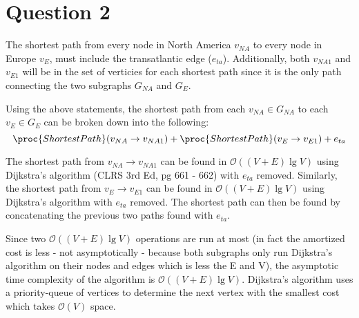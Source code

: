 \section{Question 2}
The shortest path from every node in North America $v_{NA}$ to every node in Europe $v_E$, must include the transatlantic edge ($e_{ta}$).
Additionally, both $v_{NA1}$ and $v_{E1}$ will be in the set of verticies for each shortest path since it is the only path connecting the two subgraphs $G_{NA}$ and $G_{E}$.\vspace{3mm}

Using the above statements, the shortest path from each $v_{NA} \in G_{NA}$ to each $v_E \in G_E$ can be broken down into the following:
\[\proc{ShortestPath}(v_{NA}\to v_{NA1}) + \proc{ShortestPath}(v_E \to v_{E1}) + e_{ta}\]

The shortest path from $v_{NA} \to v_{NA1}$ can be found in $\mathcal{O}((V + E)\lg{V})$ using Dijkstra's algorithm (CLRS 3rd Ed, pg 661 - 662) with $e_{ta}$ removed.
Similarly, the shortest path from $v_{E} \to v_{E1}$ can be found in $\mathcal{O}((V + E)\lg{V})$ using Dijkstra's algorithm with $e_{ta}$ removed.
The shortest path can then be found by concatenating the previous two paths found with $e_{ta}$.\vspace{3mm}

Since two $\mathcal{O}((V + E)\lg{V})$ operations are run at most (in fact the amortized cost is less - not asymptotically - because
both subgraphs only run Dijkstra's algorithm on their nodes and edges which is less the E and V), the asymptotic time complexity of the algorithm is $\mathcal{O}((V + E)\lg{V})$.
Dijkstra's algorithm uses a priority-queue of vertices to determine the next vertex with the smallest cost which takes $\mathcal{O}(V)$ space.